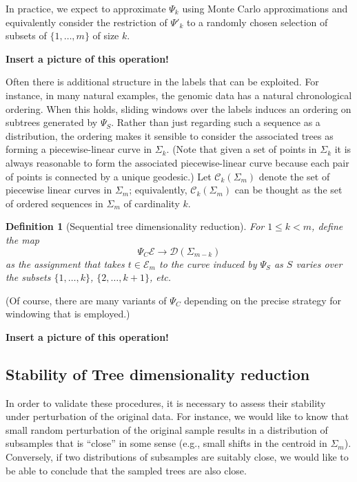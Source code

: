 \documentclass[a4paper,11pt]{article}
\newtheorem{definition}{Definition}
\newcommand{\aC}{\mathcal{C}}
\newcommand{\aD}{\mathcal{D}}
\newcommand{\aE}{\mathcal{E}}
\begin{document}
In practice, we expect to approximate $\Psi_k$ using Monte Carlo approximations and equivalently consider the restriction of $\Psi'_k$ to a randomly chosen selection of subsets of $\{1,\ldots,m\}$ of size $k$.

{\bf Insert a picture of this operation!}

Often there is additional structure in the labels that can be exploited.
For instance, in many natural examples, the genomic data has a natural chronological ordering.
When this holds, sliding windows over the labels induces an ordering on subtrees generated by $\Psi_S$.
Rather than just regarding such a sequence as a distribution, the ordering makes it sensible to consider the associated trees as forming a piecewise-linear curve in $\Sigma_k$.
(Note that given a set of points in $\Sigma_k$ it is always reasonable to form the associated piecewise-linear curve because each pair of points is connected by a unique geodesic.)
Let $\aC_k(\Sigma_m)$ denote the set of piecewise linear curves in $\Sigma_m$; equivalently, $\aC_k(\Sigma_m)$ can be thought as the set of ordered sequences in $\Sigma_m$ of cardinality $k$.

\begin{definition}[Sequential tree dimensionality reduction]
For $1 \leq k < m$, define the map
\[
\Psi_C \aE \to \aD(\Sigma_{m-k})
\]
as the assignment that takes $t \in \aE_m$ to the curve induced by $\Psi_S$ as $S$ varies over the subsets $\{1, \ldots, k\}$, $\{2, \ldots, k+1\}$, etc.
\end{definition}

(Of course, there are many variants of $\Psi_C$ depending on the precise strategy for windowing that is employed.)

{\bf Insert a picture of this operation!}

\subsection{Stability of Tree dimensionality reduction}

In order to validate these procedures, it is necessary to assess their stability under perturbation of the original data.
For instance, we would like to know that small random perturbation of the original sample results in a distribution of subsamples that is ``close'' in some sense (e.g., small shifts in the centroid in $\Sigma_m$).
Conversely, if two distributions of subsamples are suitably close, we would like to be able to conclude that the sampled trees are also close.
\end{document}
